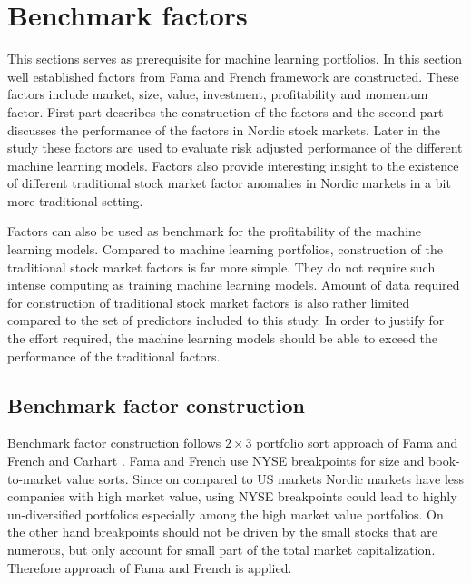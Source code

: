 \documentclass{article}
\begin{document}
\section{Benchmark factors} \label{BenchmarkFactors}

This sections serves as prerequisite for machine learning portfolios. In this section well established factors from Fama and French \citeyear{FAMA20151} framework are constructed. These factors include market, size, value, investment, profitability and momentum factor.  First part describes the construction of the factors and the second part discusses the performance of the factors in Nordic stock markets. Later in the study these factors are used to evaluate risk adjusted performance of the different machine learning models. Factors also provide interesting insight to the existence of different traditional stock market factor anomalies in Nordic markets in a bit more traditional setting. 

Factors can also be used as benchmark for the profitability of the machine learning models. Compared to machine learning portfolios, construction of the traditional stock market factors is far more simple. They do not require such intense computing as training machine learning models. Amount of data required for construction of traditional stock market factors is also rather limited compared to the set of predictors included to this study. In order to justify for the effort required, the machine learning models should be able to exceed the performance of the traditional factors.

\subsection{Benchmark factor construction}\label{BenchmarkFactorsConstruction}

Benchmark factor construction follows $2 \times 3$ portfolio sort approach of Fama and French \citeyear{FAMA19933, FAMA20151} and Carhart \citeyear{Carhart1997}. Fama and French \citeyear{FAMA19933} use NYSE breakpoints for size and book-to-market value sorts. Since on compared to US markets Nordic markets have less companies with high market value, using NYSE breakpoints could lead to highly un-diversified portfolios especially among the high market value portfolios. On the other hand breakpoints should not be driven by the small stocks that are numerous, but only account for small part of the total market capitalization. Therefore approach of Fama and French \citeyear{FAMA2012457} is applied.  \par
\end{document}
